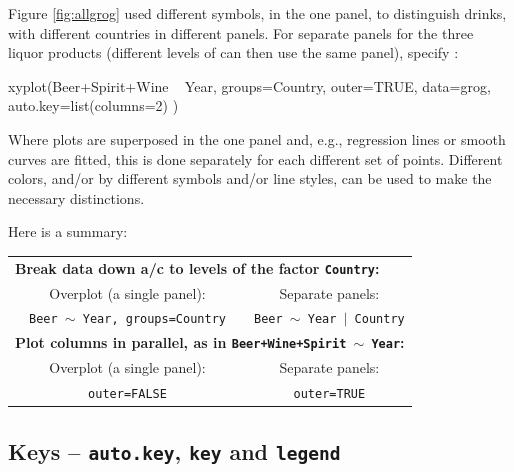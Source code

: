 Figure \ref{fig:allgrog} used different symbols, in the one panel, to
distinguish drinks, with different countries in different panels.
For separate panels for the three liquor products (different levels
of  can then use the same panel), specify :
\begin{Schunk}
\begin{Sinput}
xyplot(Beer+Spirit+Wine ~ Year,
       groups=Country, outer=TRUE,
       data=grog, auto.key=list(columns=2) )
\end{Sinput}
\end{Schunk}

Where plots are superposed in the one panel and, e.g., regression
lines or smooth curves are fitted, this is done separately for each
different set of points.  Different colors, and/or by different
symbols and/or line styles, can be used to make the necessary
distinctions.

Here is a summary:
\vspace*{9pt}

\begin{fullwidth}
\begin{tabular}{lccc}
\multicolumn{4}{l}{\bf Break data down a/c to levels of the
factor \texttt{Country}:}\\[3pt]
& Overplot (a single panel): & & Separate panels: \\
& \texttt{Beer $\sim$ Year, groups=Country} & &
\texttt{Beer $\sim$ Year $\mid$ Country}\\[12pt]
\multicolumn{4}{l}{\bf Plot columns in parallel, as in
\texttt{Beer+Wine+Spirit $\sim$ Year}:}\\[3pt]
& Overplot (a single panel): & & Separate panels: \\
& \texttt{outer=FALSE} & & \texttt{outer=TRUE}\\
\end{tabular}
\end{fullwidth}
\pagebreak

\subsection{Keys -- \texttt{auto.key}, \texttt{key} and \texttt{legend}}\label{sec:keys}

